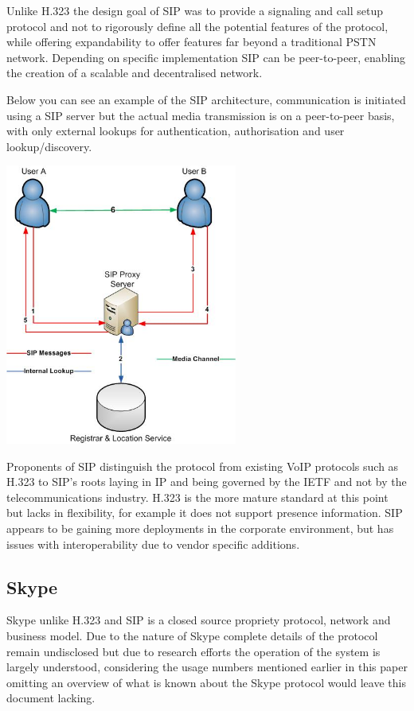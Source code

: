 Unlike H.323 the design goal of SIP was to provide a signaling and call setup protocol and not to rigorously define all the potential features of the protocol, while offering expandability to offer features far beyond a traditional PSTN network. Depending on specific implementation SIP can be peer-to-peer, enabling the creation of a scalable and decentralised network.

Below you can see an example of the SIP architecture, communication is initiated using a SIP server but the actual media transmission is on a peer-to-peer basis, with only external lookups for authentication, authorisation and user lookup/discovery.

\begin{center}
	\includegraphics[width=3in]{images/SIP_Architecture.jpg}
\end{center}

Proponents of SIP distinguish the protocol from existing VoIP protocols such as H.323 to SIP’s roots laying in IP and being governed by the IETF and not by the telecommunications industry. H.323 is the more mature standard at this point but lacks in flexibility, for example it does not support presence information. SIP appears to be gaining more deployments in the corporate environment, but has issues with interoperability due to vendor specific additions.

\subsection{Skype}
Skype unlike H.323 and SIP is a closed source propriety protocol, network and business model. Due to the nature of Skype complete details of the protocol remain undisclosed but due to research efforts the operation of the system is largely understood, considering the usage numbers mentioned earlier in this paper omitting an overview of what is known about the Skype protocol would leave this document lacking.

